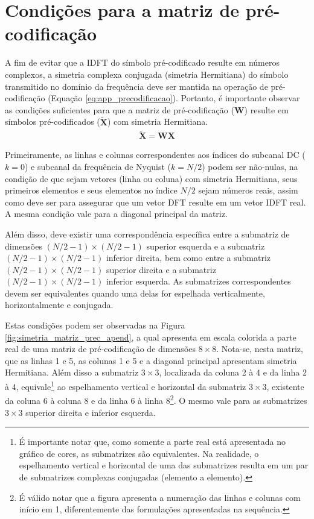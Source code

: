 \chapter{Condições para a matriz de pré-codificação}
\label{app:cond_prec_matrix}

A fim de evitar que a IDFT do símbolo pré-codificado resulte em números complexos, a simetria complexa conjugada (simetria Hermitiana) do símbolo transmitido no domínio da frequência deve ser mantida na operação de pré-codificação (Equação \ref{eq:app_precodificacao}). Portanto, é importante observar as condições suficientes para que a matriz de pré-codificação ($\mathbf{W}$) resulte em símbolos pré-codificados ($\mathbf{\tilde{X}}$) com simetria Hermitiana.
\begin{align}
\mathbf{\tilde{X}} = \mathbf{W}\mathbf{X}
\label{eq:app_precodificacao}
\end{align}

Primeiramente, as linhas e colunas correspondentes aos índices do subcanal DC ($k=0$) e subcanal da frequência de Nyquist ($k=N/2$) podem ser não-nulas, na condição de que sejam vetores (linha ou coluna) com simetria Hermitiana, seus primeiros elementos e seus elementos no índice $N/2$ sejam números reais, assim como deve ser para assegurar que um vetor DFT resulte em um vetor IDFT real. A mesma condição vale para a diagonal principal da matriz.

Além disso, deve existir uma correspondência específica entre a submatriz de dimensões $(N/2 -1)\times(N/2-1)$ superior esquerda e a submatriz $(N/2 -1)\times(N/2-1)$ inferior direita, bem como entre a submatriz $(N/2 -1)\times(N/2-1)$ superior direita e a submatriz $(N/2 -1)\times(N/2-1)$ inferior esquerda. As submatrizes correspondentes devem ser equivalentes quando uma delas for espelhada verticalmente, horizontalmente e conjugada. 

Estas condições podem ser observadas na Figura \ref{fig:simetria_matriz_prec_apend}, a qual apresenta em escala colorida a parte real de uma matriz de pré-codificação de dimensões $8 \times 8$. Nota-se, nesta matriz, que as linhas 1 e 5, as colunas 1 e 5 e a diagonal principal apresentam simetria Hermitiana. Além disso a submatriz $3 \times 3$, localizada da coluna 2 à 4 e da linha 2 à 4, equivale\footnote{É importante notar que, como somente a parte real está apresentada no gráfico de cores, as submatrizes são equivalentes. Na realidade, o espelhamento vertical e horizontal de uma das submatrizes resulta em um par de submatrizes complexas conjugadas (elemento a elemento).} ao espelhamento vertical e horizontal da submatriz $3 \times 3$, existente da coluna 6 à coluna 8 e da linha 6 à linha 8\footnote{É válido notar que a figura apresenta a numeração das linhas e colunas com início em 1, diferentemente das formulações apresentadas na sequência.}. O mesmo vale para as submatrizes $3 \times 3$ superior direita e inferior esquerda.

